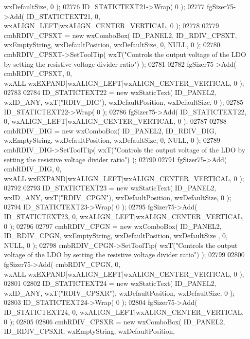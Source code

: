 \begin{DoxyCode}
      wxDefaultSize, 0 );
02776     ID_STATICTEXT21->Wrap( 0 );
02777     fgSizer75->Add( ID_STATICTEXT21, 0, wxALIGN\_LEFT|wxALIGN\_CENTER\_VERTICAL, 0 );
02778     
02779     cmbRDIV_CPSXT = \textcolor{keyword}{new} wxComboBox( ID_PANEL2, ID_RDIV_CPSXT, wxEmptyString, wxDefaultPosition, 
      wxDefaultSize, 0, NULL, 0 ); 
02780     cmbRDIV_CPSXT->SetToolTip( wxT(\textcolor{stringliteral}{"Controls the output voltage of the LDO by setting the resistive voltage
       divider ratio"}) );
02781     
02782     fgSizer75->Add( cmbRDIV_CPSXT, 0, wxALL|wxEXPAND|wxALIGN\_LEFT|wxALIGN\_CENTER\_VERTICAL, 0 );
02783     
02784     ID_STATICTEXT22 = \textcolor{keyword}{new} wxStaticText( ID_PANEL2, wxID\_ANY, wxT(\textcolor{stringliteral}{"RDIV\_DIG"}), wxDefaultPosition, 
      wxDefaultSize, 0 );
02785     ID_STATICTEXT22->Wrap( 0 );
02786     fgSizer75->Add( ID_STATICTEXT22, 0, wxALIGN\_LEFT|wxALIGN\_CENTER\_VERTICAL, 0 );
02787     
02788     cmbRDIV_DIG = \textcolor{keyword}{new} wxComboBox( ID_PANEL2, ID_RDIV_DIG, wxEmptyString, wxDefaultPosition, wxDefaultSize, 
      0, NULL, 0 ); 
02789     cmbRDIV_DIG->SetToolTip( wxT(\textcolor{stringliteral}{"Controls the output voltage of the LDO by setting the resistive voltage
       divider ratio"}) );
02790     
02791     fgSizer75->Add( cmbRDIV_DIG, 0, wxALL|wxEXPAND|wxALIGN\_LEFT|wxALIGN\_CENTER\_VERTICAL, 0 );
02792     
02793     ID_STATICTEXT23 = \textcolor{keyword}{new} wxStaticText( ID_PANEL2, wxID\_ANY, wxT(\textcolor{stringliteral}{"RDIV\_CPGN"}), wxDefaultPosition, 
      wxDefaultSize, 0 );
02794     ID_STATICTEXT23->Wrap( 0 );
02795     fgSizer75->Add( ID_STATICTEXT23, 0, wxALIGN\_LEFT|wxALIGN\_CENTER\_VERTICAL, 0 );
02796     
02797     cmbRDIV_CPGN = \textcolor{keyword}{new} wxComboBox( ID_PANEL2, ID_RDIV_CPGN, wxEmptyString, wxDefaultPosition, wxDefaultSize
      , 0, NULL, 0 ); 
02798     cmbRDIV_CPGN->SetToolTip( wxT(\textcolor{stringliteral}{"Controls the output voltage of the LDO by setting the resistive voltage
       divider ratio"}) );
02799     
02800     fgSizer75->Add( cmbRDIV_CPGN, 0, wxALL|wxEXPAND|wxALIGN\_LEFT|wxALIGN\_CENTER\_VERTICAL, 0 );
02801     
02802     ID_STATICTEXT24 = \textcolor{keyword}{new} wxStaticText( ID_PANEL2, wxID\_ANY, wxT(\textcolor{stringliteral}{"RDIV\_CPSXR"}), wxDefaultPosition, 
      wxDefaultSize, 0 );
02803     ID_STATICTEXT24->Wrap( 0 );
02804     fgSizer75->Add( ID_STATICTEXT24, 0, wxALIGN\_LEFT|wxALIGN\_CENTER\_VERTICAL, 0 );
02805     
02806     cmbRDIV_CPSXR = \textcolor{keyword}{new} wxComboBox( ID_PANEL2, ID_RDIV_CPSXR, wxEmptyString, wxDefaultPosition, 

\end{DoxyCode}
